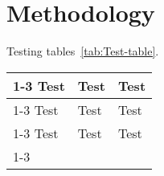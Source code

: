 \chapter{Methodology}

Testing tables~\ref{tab:Test-table}. 

\begin{table*}[!hbt]
   \caption{Test Table.}\label{tab:Test-table}
   \vspace{0.2in}
\begin{tabularx}{\textwidth}{|X|X|X|}
    \cline{1-3}
    \bf Test & \bf Test & \bf Test \\
    \cline{1-3}
    Test & Test & Test \\
    \cline{1-3}
    Test & Test & Test \\
    \cline{1-3}
\end{tabularx}
\end{table*}
